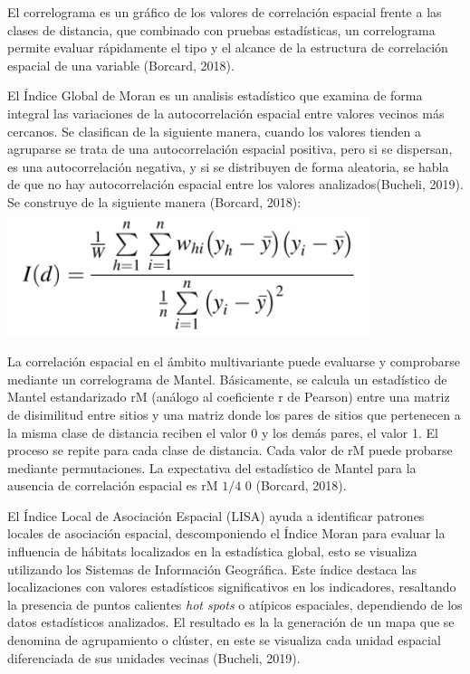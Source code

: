 \documentclass[11pt,]{article}
\begin{document}
El correlograma es un gráfico de los valores de correlación espacial
frente a las clases de distancia, que combinado con pruebas
estadísticas, un correlograma permite evaluar rápidamente el tipo y el
alcance de la estructura de correlación espacial de una variable
(Borcard, 2018).

El Índice Global de Moran es un analisis estadístico que examina de
forma integral las variaciones de la autocorrelación espacial entre
valores vecinos más cercanos. Se clasifican de la siguiente manera,
cuando los valores tienden a agruparse se trata de una autocorrelación
espacial positiva, pero si se dispersan, es una autocorrelación
negativa, y si se distribuyen de forma aleatoria, se habla de que no hay
autocorrelación espacial entre los valores analizados(Bucheli, 2019). Se
construye de la siguiente manera (Borcard, 2018):
\includegraphics{moran1.PNG}

La correlación espacial en el ámbito multivariante puede evaluarse y
comprobarse mediante un correlograma de Mantel. Básicamente, se calcula
un estadístico de Mantel estandarizado rM (análogo al coeficiente r de
Pearson) entre una matriz de disimilitud entre sitios y una matriz donde
los pares de sitios que pertenecen a la misma clase de distancia reciben
el valor 0 y los demás pares, el valor 1. El proceso se repite para cada
clase de distancia. Cada valor de rM puede probarse mediante
permutaciones. La expectativa del estadístico de Mantel para la ausencia
de correlación espacial es rM \(1/4\) 0 (Borcard, 2018).

El Índice Local de Asociación Espacial (LISA) ayuda a identificar
patrones locales de asociación espacial, descomponiendo el Índice Moran
para evaluar la influencia de hábitats localizados en la estadística
global, esto se visualiza utilizando los Sistemas de Información
Geográfica. Este índice destaca las localizaciones con valores
estadísticos significativos en los indicadores, resaltando la presencia
de puntos calientes \emph{hot spots} o atípicos espaciales, dependiendo
de los datos estadísticos analizados. El resultado es la la generación
de un mapa que se denomina de agrupamiento o clúster, en este se
visualiza cada unidad espacial diferenciada de sus unidades vecinas
(Bucheli, 2019).
\end{document}
